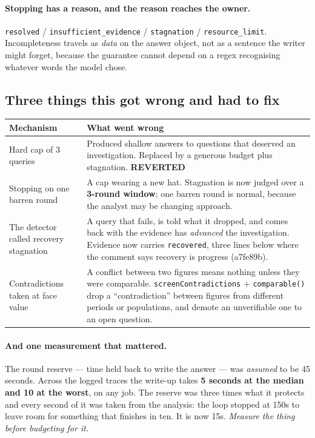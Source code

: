 \documentclass[11pt,a4paper]{report}
\newcommand{\code}[1]{\texttt{\small #1}}
\newcommand{\sha}[1]{{\ttfamily\small\color{slate}#1}}
\newcommand{\verdictR}{{\color{amber}\textbf{REVERTED}}}
\begin{document}
\paragraph{Stopping has a reason, and the reason reaches the owner.}
\code{resolved} / \code{insufficient\_evidence} / \code{stagnation} / \code{resource\_limit}.
Incompleteness travels as \emph{data} on the answer object, not as a sentence the writer might
forget, because the guarantee cannot depend on a regex recognising whatever words the model chose.

\subsection{Three things this got wrong and had to fix}

\begin{center}
\small
\begin{tabular}{@{}p{4.4cm}p{10.4cm}@{}}
\toprule
\textbf{Mechanism} & \textbf{What went wrong}\\
\midrule
Hard cap of 3 queries & Produced shallow answers to questions that deserved an investigation.
 Replaced by a generous budget plus stagnation. \verdictR\\
Stopping on one barren round & A cap wearing a new hat. Stagnation is now judged over a
 \textbf{3-round window}; one barren round is normal, because the analyst may be changing approach.\\
The detector called recovery stagnation & A query that fails, is told what it dropped, and comes
 back with the evidence has \emph{advanced} the investigation. Evidence now carries
 \code{recovered}, three lines below where the comment says recovery is progress (\sha{a7fe89b}).\\
Contradictions taken at face value & A conflict between two figures means nothing unless they were
 comparable. \code{screenContradictions} + \code{comparable()} drop a ``contradiction'' between
 figures from different periods or populations, and demote an unverifiable one to an open question.\\
\bottomrule
\end{tabular}
\end{center}

\paragraph{And one measurement that mattered.} The round reserve --- time held back to write the
answer --- was \emph{assumed} to be 45 seconds. Across the logged traces the write-up takes
\textbf{5 seconds at the median and 10 at the worst}, on any job. The reserve was three times what
it protects and every second of it was taken from the analysis: the loop stopped at 150s to leave
room for something that finishes in ten. It is now 15s. \emph{Measure the thing before budgeting
for it.}
\end{document}
